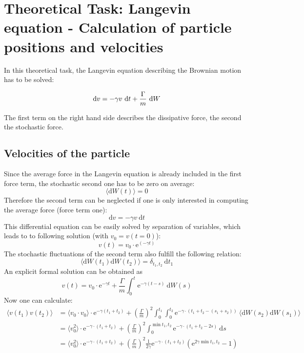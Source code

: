 \documentclass[12pt,a4paper]{scrartcl}
\begin{document}
\section{Theoretical Task: Langevin equation - Calculation of particle
positions and velocities}
In this theoretical task, the Langevin equation describing the Brownian motion has to be solved:

\begin{equation}
	\text{d}v = - \gamma v \text ~ \text{d}t + \frac{\Gamma}{m}~\text{d}W
\end{equation}

The first term on the right hand side describes the dissipative force, the second the stochastic force.

\newpage
\subsection{Velocities of the particle}
Since the average force in the Langevin equation is already included in the first force term, the stochastic second one has to be zero on average: 
\begin{equation}
	\langle \text{d}W(t) \rangle = 0
\end{equation}
Therefore the second term can be neglected if one is only interested in computing the average force (force term one):
\begin{equation}
	\text{d} v = - \gamma v ~ \text{d} t
\end{equation}
This differential equation can be easily solved by separation of variables, which leads to to following solution (with $v_0 = v(t=0)$):
\begin{equation} 
	v(t) = v_0 \cdot \text{e}^{(-\gamma t)}
\end{equation}
The stochastic fluctuations of the second term also fulfill the following relation:
\begin{equation}
	\langle\text{d}W(t_1)\text{d}W(t_2)\rangle =  \delta_{t_1,t_2} ~ \text{d}t_1
\end{equation}
An explicit formal solution can be obtained as
\begin{equation}
	v(t) = v_0 \cdot \text{e}^{-\gamma t} + \frac{\Gamma}{m} \int_0^t \text{e}^ {-\gamma(t-s)}~\text{d}W(s)
	\label{eqn:v}
\end{equation}
Now one can calculate:
\begin{align}
	\langle v(t_1)v(t_2) \rangle &= \langle v_0 \cdot  v_0\rangle \cdot \text{e}^{-\gamma (t_1+t_2)}
 + \left( \frac{\Gamma}{m} \right)^2 \int_0^{t_1} \int_0^{t_2} \text{e}^ {-\gamma\cdot(t_1+t_2-(s_1+s_2))}~\langle\text{d}W(s_2)\text{d}W(s_1)\rangle\\
	&= \langle v_0^2\rangle \cdot \text{e}^{-\gamma\cdot (t_1+t_2)}	
	 + \left( \frac{\Gamma}{m} \right)^2  \int_0^{\min{t_1, t_2}} \text{e}^ {-\gamma\cdot(t_1+t_2-2s)}~\text{d}s\\
	&= \langle v_0^2\rangle \cdot \text{e}^{-\gamma\cdot (t_1+t_2)}+ \left( \frac{\Gamma}{m} \right)^2 \frac{1}{2 \gamma} \text{e}^ {-\gamma\cdot(t_1+t_2)}\left( \text{e}^ {2\gamma \min{t_1, t_2}} - 1 \right)
\end{align}
\end{document}
